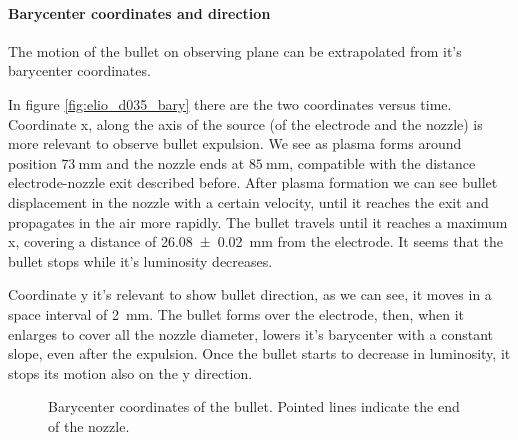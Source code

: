\paragraph{Barycenter coordinates and direction}
The motion of the bullet on observing plane can be extrapolated from it's barycenter coordinates.

In figure \ref{fig:elio_d035_bary} there are the two coordinates versus time.
Coordinate x, along the axis of the source (of the electrode and the nozzle) is more relevant to observe bullet expulsion. We see as plasma forms around position $\SI{73}{\milli\meter}$ and the nozzle ends at $\SI{85}{\milli\meter}$, compatible with the distance electrode-nozzle exit described before. After plasma formation we can see bullet displacement in the nozzle with a certain velocity, until it reaches the exit and propagates in the air more rapidly. The bullet travels until it reaches a maximum x, covering a distance of \SI{26.08(2)}{\milli\meter} from the electrode. It seems that the bullet stops while it's luminosity decreases.

Coordinate y it's relevant to show bullet direction, as we can see, it moves in a space interval of \SI{2}{\milli\meter}. The bullet forms over the electrode, then, when it enlarges to cover all the nozzle diameter, lowers it's barycenter with a constant slope, even after the expulsion. Once the bullet starts to decrease in luminosity, it stops its motion also on the y direction.
\begin{figure}
 \centering
 \hfill
 \caption{Barycenter coordinates of the bullet. Pointed lines indicate the end of the nozzle.}
 \label{fig:elio_d035_I}
\end{figure}

